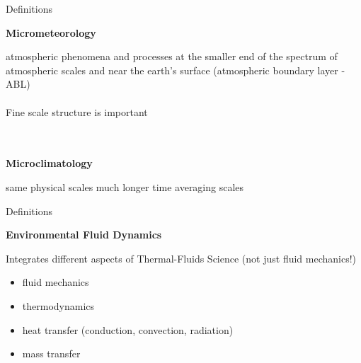 \begin{frame}{Definitions}

{\large \textbf{Micrometeorology}}
\\\vspace{2pt}
\begin{fancydefs}
	atmospheric phenomena and processes at the smaller end of the spectrum of atmospheric scales and near the earth’s surface (atmospheric boundary layer - ABL)
	\\\\Fine scale structure is important
\end{fancydefs}
~\\~\\
{\large \textbf{Microclimatology}}
\\\vspace{2pt}
\begin{fancydefs}
	same physical scales much longer time averaging scales
\end{fancydefs}

\end{frame}


\begin{frame}{Definitions}

{\large \textbf{Environmental Fluid Dynamics}}
\\\vspace{2pt}
\begin{fancydefs}
	Integrates different aspects of Thermal-Fluids Science (not just fluid mechanics!)\\
	\begin{itemize}
		\item fluid mechanics
		\item thermodynamics
		\item heat transfer (conduction, convection, radiation)
		\item mass transfer
	\end{itemize}

\end{fancydefs}
\end{frame}

